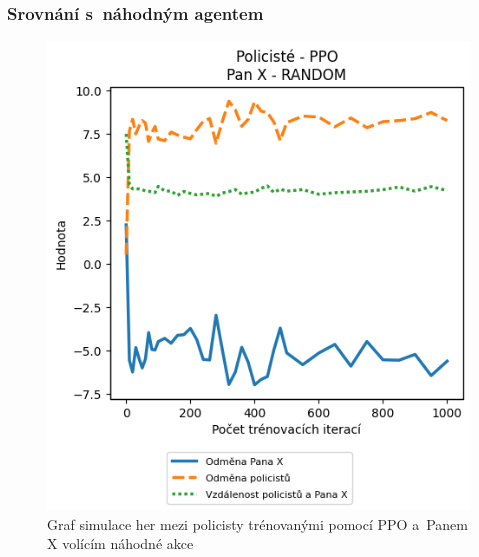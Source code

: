 \subsubsection*{Srovnání s~náhodným agentem}
\begin{figure}[H]
  \begin{minipage}{.48\textwidth}
    \centering
    \includegraphics[width=1\textwidth]{obrazky-figures/graphs/cop_PPO_mrx_RANDOM}
    \caption{Graf simulace her mezi policisty trénovanými pomocí PPO a~Panem X volícím náhodné akce}
    \label{fig:cop_ppo_mrx_random}
  \end{minipage}\hfill
  \begin{minipage}{.48\textwidth}
    \centering

\end{minipage}
\end{figure}
